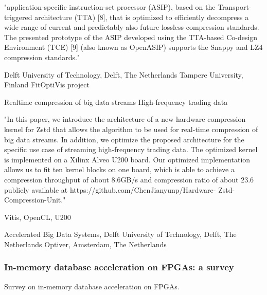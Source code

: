 "application-specific instruction-set processor (ASIP), based on the
Transport-triggered architecture (TTA) [8], that is optimized to efficiently
decompress a wide range of current and predictably also
future lossless compression standards. The presented prototype of
the ASIP developed using the TTA-based Co-design Environment
(TCE) [9] (also known as OpenASIP) supports the Snappy and LZ4
compression standards."

Delft University of Technology, Delft, The Netherlands
Tampere University, Finland
FitOptiVis project

\cite{Chen2021FPGAAlgorithm}
Realtime compression of big data streams
High-frequency trading data

"In this paper, we introduce the
architecture of a new hardware compression kernel for Zstd
that allows the algorithm to be used for real-time compression
of big data streams. In addition, we optimize the proposed
architecture for the specific use case of streaming high-frequency
trading data. The optimized kernel is implemented on a Xilinx
Alveo U200 board. Our optimized implementation allows us to
fit ten kernel blocks on one board, which is able to achieve a
compression throughput of about 8.6GB/s and compression ratio
of about 23.6%
publicly available at https://github.com/ChenJianyunp/Hardware-
Zstd-Compression-Unit."

Vitis, OpenCL, U200

Accelerated Big Data Systems, Delft University of Technology, Delft, The Netherlands
Optiver, Amsterdam, The Netherlands

\subsubsection{In-memory database acceleration on FPGAs: a survey}
\cite{Fang2020In-memorySurvey}
Survey on in-memory database acceleration on FPGAs.

